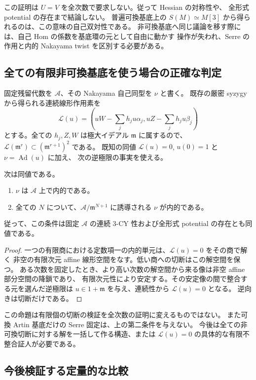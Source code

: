この証明は $U=V$ を全次数で要求しない。従って Hessian の対称性や、
全形式 potential の存在まで結論しない。
普遍可換基底上の $S(M)\simeq M[3]$ から得られるのは、この意味の自己双対性である。
非可換基底へ同じ議論を移す際には、自己 Hom の係数を基底環の元として自由に動かす
操作が失われ、Serre の作用と内的 Nakayama twist を区別する必要がある。

\subsection{全ての有限非可換基底を使う場合の正確な判定}

固定残留代数を $\mathcal A$、その Nakayama 自己同型を $\nu$ と書く。
既存の厳密 syzygy から得られる連続線形作用素を
\[
\mathcal L(u)=\left(uW-\sum_jh_ju\alpha_j,
                   uZ-\sum_jh_ju\beta_j\right)
\]
とする。全ての $h_j,Z,W$ は極大イデアル $\mathfrak m$ に属するので、
$\mathcal L(\mathfrak m^r)\subset(\mathfrak m^{r+1})^2$ である。
既知の同値 $\mathcal L(u)=0$, $u(0)=1$ と $\nu=\operatorname{Ad}(u)$ に加え、
次の逆極限の事実を使える。

\begin{proposition}[有限単元解の整合性を事前に仮定しない判定]
次は同値である。
\begin{enumerate}
\item $\nu$ は $\mathcal A$ 上で内的である。
\item 全ての $N$ について、$\mathcal A/\mathfrak m^{N+1}$ に誘導される $\nu$ が内的である。
\end{enumerate}
従って、この条件は固定 $\mathcal A$ の連続 $3$-CY 性および全形式 potential の存在とも同値である。
\end{proposition}
\begin{proof}
一つの有限商における定数項一の内的単元は、$\mathcal L(u)=0$ をその商で解く
非空の有限次元 affine 線形空間をなす。低い商への切断はこの解空間を保つ。
ある次数を固定したとき、より高い次数の解空間から来る像は非空 affine 部分空間の降鎖であり、
有限次元性により安定する。その安定像の間で整合する元を選んだ逆極限は
$u\in1+\mathfrak m$ を与え、連続性から $\mathcal L(u)=0$ となる。
逆向きは切断だけである。
\end{proof}

この命題は有限個の切断の検証を全次数の証明に変えるものではない。
また可換 Artin 基底だけの Serre 固定は、上の第二条件を与えない。
今後は全ての非可換切断に対する解を一括して作る構造、または
$\mathcal L(u)=0$ の具体的な有限不整合証人が必要である。

\subsection{今後検証する定量的な比較}

